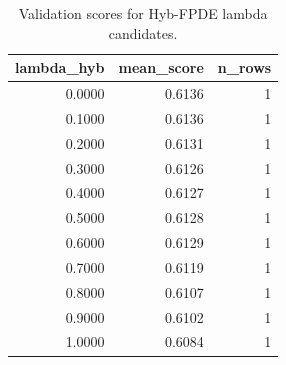 \begin{table}[t]
\caption{Validation scores for Hyb-FPDE lambda candidates.}
\label{tab:lambda_distribution_computed}
\centering
\begin{tabular}{rrr}
\toprule
lambda\_hyb & mean\_score & n\_rows \\
\midrule
0.0000 & 0.6136 & 1 \\
0.1000 & 0.6136 & 1 \\
0.2000 & 0.6131 & 1 \\
0.3000 & 0.6126 & 1 \\
0.4000 & 0.6127 & 1 \\
0.5000 & 0.6128 & 1 \\
0.6000 & 0.6129 & 1 \\
0.7000 & 0.6119 & 1 \\
0.8000 & 0.6107 & 1 \\
0.9000 & 0.6102 & 1 \\
1.0000 & 0.6084 & 1 \\
\bottomrule
\end{tabular}

\end{table}
